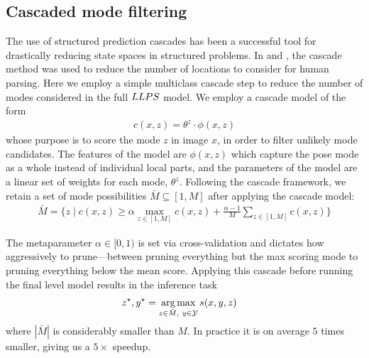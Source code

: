 \subsection{Cascaded mode filtering}

The use of structured prediction cascades has been a successful tool for 
drastically reducing state spaces in structured problems.  In  and 
, the cascade method was used to reduce
the number of locations to consider for human parsing.  Here we employ a simple 
multiclass cascade step to reduce the number of modes considered in the full 
$LLPS$ model. We employ a cascade model of the form \begin{align}
c(x,z) = \theta^z \cdot \phi(x,z)
\end{align}
whose purpose is to score the mode $z$ in image $x$, in order to filter 
unlikely mode candidates.  The features of the model are $\phi(x,z)$ which 
capture the pose mode as a whole instead of individual local parts, and the 
parameters of the model are a linear set of weights for each mode, $\theta^z$.  
Following the cascade framework, we retain a set of mode possibilities $\bar{M} 
\subseteq [1,M]$ after applying the cascade model:
\begin{align}
\bar{M} = \{ z \;|\; c(x,z) \geq \alpha \max_{z \in [1,M]} c(x,z) + 
\frac{\alpha-1}{M} \sum_{z \in [1,M]} c(x,z) \}
\end{align}

The metaparameter $\alpha \in [0,1)$ is set via cross-validation and dictates 
how aggressively to prune---between pruning everything but the max scoring mode 
to pruning everything below the mean score.  Applying this cascade before 
running the final level \LLPS model results in the inference task
\begin{align}
z^\star,y^\star &= \mathop{\arg\max}_{z \in \bar{M},~y \in \mathcal{Y}} s(x,y,z) 
\end{align}
where $|\bar{M}|$ is considerably smaller than $M$.  In practice it is on 
average $5$ times smaller, giving us a $5\times$ speedup.


